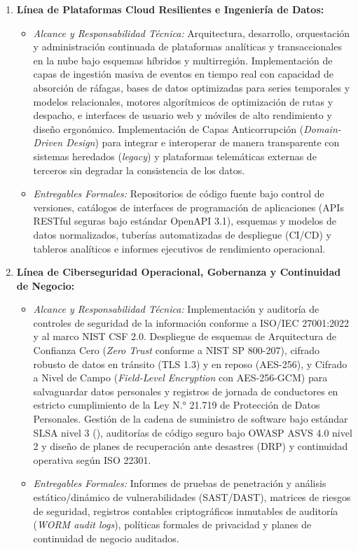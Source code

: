 \begin{enumerate}
  \item \textbf{Línea de Plataformas Cloud Resilientes e Ingeniería de Datos:}
  \begin{itemize}
    \item \textit{Alcance y Responsabilidad Técnica:} Arquitectura, desarrollo, orquestación y administración continuada de plataformas analíticas y transaccionales en la nube bajo esquemas híbridos y multirregión. Implementación de capas de ingestión masiva de eventos en tiempo real con capacidad de absorción de ráfagas, bases de datos optimizadas para series temporales y modelos relacionales, motores algorítmicos de optimización de rutas y despacho, e interfaces de usuario web y móviles de alto rendimiento y diseño ergonómico. Implementación de Capas Anticorrupción (\textit{Domain-Driven Design}) para integrar e interoperar de manera transparente con sistemas heredados (\textit{legacy}) y plataformas telemáticas externas de terceros sin degradar la consistencia de los datos.
    \item \textit{Entregables Formales:} Repositorios de código fuente bajo control de versiones, catálogos de interfaces de programación de aplicaciones (APIs RESTful seguras bajo estándar OpenAPI 3.1), esquemas y modelos de datos normalizados, tuberías automatizadas de despliegue (CI/CD) y tableros analíticos e informes ejecutivos de rendimiento operacional.
  \end{itemize}

  \item \textbf{Línea de Ciberseguridad Operacional, Gobernanza y Continuidad de Negocio:}
  \begin{itemize}
    \item \textit{Alcance y Responsabilidad Técnica:} Implementación y auditoría de controles de seguridad de la información conforme a ISO/IEC 27001:2022 y al marco NIST CSF 2.0. Despliegue de esquemas de Arquitectura de Confianza Cero (\textit{Zero Trust} conforme a NIST SP 800-207), cifrado robusto de datos en tránsito (TLS 1.3) y en reposo (AES-256), y Cifrado a Nivel de Campo (\textit{Field-Level Encryption} con AES-256-GCM) para salvaguardar datos personales y registros de jornada de conductores en estricto cumplimiento de la Ley N.° 21.719 de Protección de Datos Personales. Gestión de la cadena de suministro de software bajo estándar SLSA nivel 3 (), auditorías de código seguro bajo OWASP ASVS 4.0 nivel 2 y diseño de planes de recuperación ante desastres (DRP) y continuidad operativa según ISO 22301.
    \item \textit{Entregables Formales:} Informes de pruebas de penetración y análisis estático/dinámico de vulnerabilidades (SAST/DAST), matrices de riesgos de seguridad, registros contables criptográficos inmutables de auditoría (\textit{WORM audit logs}), políticas formales de privacidad y planes de continuidad de negocio auditados.
  \end{itemize}
\end{enumerate}

